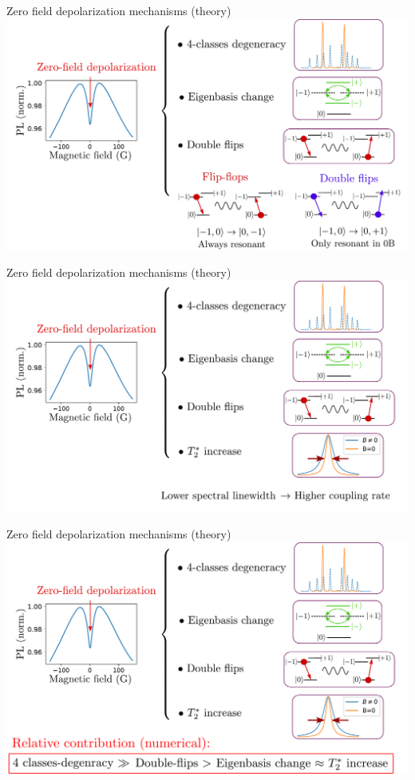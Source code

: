 \documentclass{beamer}
\begin{document}
\begin{frame}{Zero field depolarization mechanisms (theory)}
\centering
\includegraphics[width=\textwidth,height=0.85\textheight,keepaspectratio]{Slide_0B_theorie_f-2}
\end{frame}

\begin{frame}{Zero field depolarization mechanisms (theory)}
\centering
\includegraphics[width=\textwidth,height=0.85\textheight,keepaspectratio]{Slide_0B_theorie_f-1}
\end{frame}

\begin{frame}{Zero field depolarization mechanisms (theory)}
\centering
\includegraphics[width=\textwidth,height=0.85\textheight,keepaspectratio]{Slide_0B_theorie_f}
\end{frame}
\end{document}
